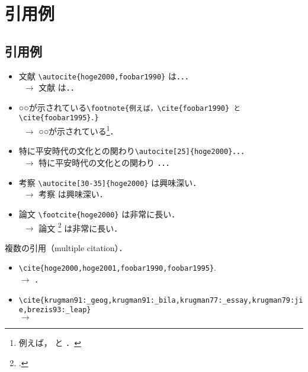 
\section{引用例}

\subsection{引用例}

\begin{itemize}
 \item 文献 \verb|\autocite{hoge2000,foobar1990}| は．．． \\
       \ $\rightarrow$ 文献 \autocite{hoge2000,foobar1990} は．．
 \item ○○が示されている\verb|\footnote{例えば，\cite{foobar1990} と \cite{foobar1995}．}| \\
       \ $\rightarrow$ ○○が示されている\footnote{例えば，\cite{foobar1990} と \cite{foobar1995}．}．
 \item 特に平安時代の文化との関わり\verb|\autocite[25]{hoge2000}|．．．\\
       \ $\rightarrow$ 特に平安時代の文化との関わり \autocite[25]{hoge2000}．．．
 \item 考察 \verb|\autocite[30-35]{hoge2000}| は興味深い．\\
       \ $\rightarrow$ 考察 \autocite[30-35]{hoge2000} は興味深い．
 \item 論文 \verb|\footcite{hoge2000}| は非常に長い．\\
       \ $\rightarrow$ 論文 \footcite{hoge2000} は非常に長い．
\end{itemize}

複数の引用（multiple citation）．
\begin{itemize}
 \item \verb|\cite{hoge2000,hoge2001,foobar1990,foobar1995}|. \\
       $\rightarrow$ \cite{hoge2000,hoge2001,foobar1990,foobar1995}．
 \item \verb|\cite{krugman91:_geog,krugman91:_bila,krugman77:_essay,krugman79:jie,brezis93:_leap}| \\
       $\rightarrow$ \cite{krugman91:_geog,krugman91:_bila,krugman77:_essay,krugman79:jie,brezis93:_leap}
\end{itemize}

